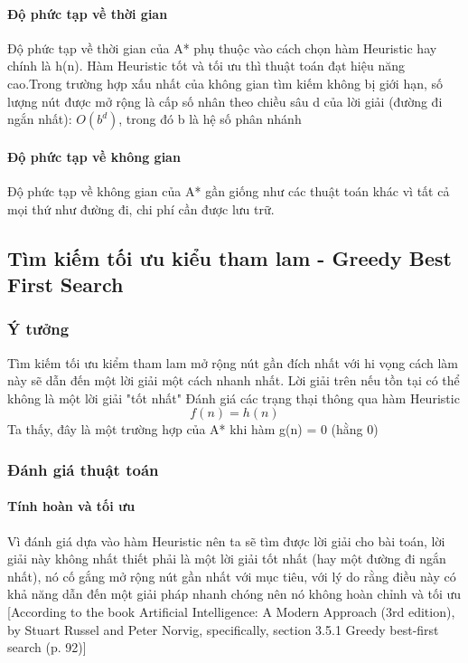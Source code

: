 \documentclass{article}
\begin{document}
\paragraph{Độ phức tạp về thời gian}
Độ phức tạp về thời gian của A* phụ thuộc vào cách chọn hàm Heuristic hay chính là h(n). Hàm Heuristic tốt và tối ưu thì thuật toán đạt hiệu năng cao.Trong trường hợp xấu nhất của không gian tìm kiếm không bị giới hạn, số lượng nút được mở rộng là cấp số nhân theo chiều sâu d của lời giải (đường đi ngắn nhất): $O(b^{d})$, trong đó b là hệ số phân nhánh
\paragraph{Độ phức tạp về không gian}
Độ phức tạp về không gian của A* gần giống như các thuật toán khác vì tất cả mọi thứ như đường đi, chi phí cần được lưu trữ. 
\subsection{Tìm kiếm tối ưu kiểu tham lam - Greedy Best First Search}

\subsubsection{Ý tưởng}
Tìm kiếm tối ưu kiểm tham lam mở rộng nút gần đích nhất với hi vọng cách làm này sẽ dẫn đến một lời giải một cách nhanh nhất. Lời giải trên nếu tồn tại có thể không là một lời giải "tốt nhất"\newline
Đánh giá các trạng thại thông qua hàm Heuristic
$$f(n) = h(n)$$
Ta thấy, đây là một trường hợp của A* khi hàm g(n) = 0 (hằng 0)

\subsubsection{Đánh giá thuật toán}

\paragraph{Tính hoàn và tối ưu}
Vì đánh giá dựa vào hàm Heuristic nên ta sẽ tìm được lời giải cho bài toán, lời giải này không nhất thiết phải là một lời giải tốt nhất (hay một đường đi ngắn nhất), nó cố gắng mở rộng nút gần nhất với mục tiêu, với lý do rằng điều này có khả năng dẫn đến một giải pháp nhanh chóng nên nó không hoàn chỉnh và tối ưu [According to the book Artificial Intelligence: A Modern Approach (3rd edition), by Stuart Russel and Peter Norvig, specifically, section 3.5.1 Greedy best-first search (p. 92)]
\end{document}
